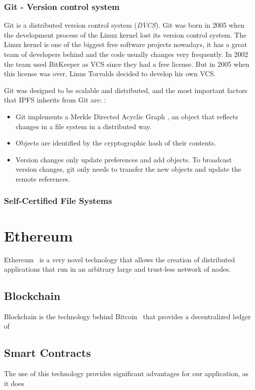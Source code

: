 \subsubsection{Git - Version control system}
\label{tech:sec:ipfs:git}
Git is a distributed version control system (\emph{DVCS})\cite{torvalds2010git}.
Git was born in 2005 when the development process of the Linux kernel lost its
version control system. The Linux kernel is one of the biggest free software
projects nowadays, it has a great team of developers behind and the code usually
changes very frequently. In 2002 the team used BitKeeper as VCS since they had a
free license. But in 2005 when this license was over, Linus Torvalds decided to
develop his own VCS\cite{spinellis2005version}.

Git was designed to be scalable and distributed, and the most important factors
that IPFS inherits from Git are: \cite{benet2014ipfs}:

\begin{itemize}
\item Git implements a Merkle Directed Acyclic Graph
  \cite{bleichenbacher1994directed}, an object that reflects changes in a file
  system in a distributed way.
\item Objects are identified by the cryptographic hash of their contents.
\item Version changes only update preferences and add objects. To broadcast
  version changes, git only needs to transfer the new objects and update the
  remote references.
\end{itemize}

\subsubsection{Self-Certified File Systems}
\label{tech:sec:ipfs:scfs}

\section{Ethereum}
\label{tech:sec:ethereum}

Ethereum~\cite{buterin2014ethereum} is a very novel technology that allows the
creation of distributed applications that run in an arbitrary large and
trust-less network of nodes.

\subsection{Blockchain}
\label{tech:sec:ethereum:bc}
Blockchain is the technology behind Bitcoin~\cite{nakamoto2008bitcoin} that
provides a decentralized ledger of 

\subsection{Smart Contracts}
\label{tech:sec:ethereum:sm}
The use of this technology provides significant advantages for our
application, as it does 
